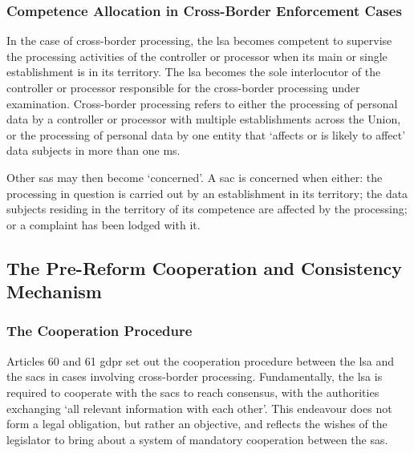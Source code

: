 \subsubsection{Competence Allocation in Cross-Border Enforcement Cases}
\label{sec:ch3-competence-allocation}

In the case of cross-border processing, the \gls{lsa} becomes competent to supervise the processing activities of the controller or processor when its main or single establishment is in its territory.\autocite[56(1)]{GDPR}
The \gls{lsa} becomes the sole interlocutor of the controller or processor responsible for the cross-border processing under examination.\autocite[56(6)]{GDPR}
Cross-border processing refers to either the processing of personal data by a controller or processor with multiple establishments across the Union, or the processing of personal data by one entity that `affects or is likely to affect' data subjects in more than one \gls{ms}.\autocite[4(23)]{GDPR}

Other \glspl{sa} may then become `concerned'.\autocite[4(22)]{GDPR} 
A \gls{sac} is concerned when either: the processing in question is carried out by an establishment in its territory; the data subjects residing in the territory of its competence are affected by the processing; or a complaint has been lodged with it.\autocite[4(22)(a)--(c)]{GDPR}

\subsection{The Pre-Reform Cooperation and Consistency Mechanism}
\label{sec:ch3-pre-reform-mechanism}

\subsubsection{The Cooperation Procedure}
\label{sec:ch3-cooperation-procedure}

Articles 60 and 61 \gls{gdpr} set out the cooperation procedure between the \gls{lsa} and the \glspl{sac} in cases involving cross-border processing. 
Fundamentally, the \gls{lsa} is required to cooperate with the \glspl{sac} to reach consensus, with the authorities exchanging `all relevant information with each other'.\autocite[60(1)]{GDPR}
This endeavour does not form a legal obligation, but rather an objective, and reflects the wishes of the legislator to bring about a system of mandatory cooperation between the \glspl{sa}.\autocite[39--43]{edpbGuidelines022022}

